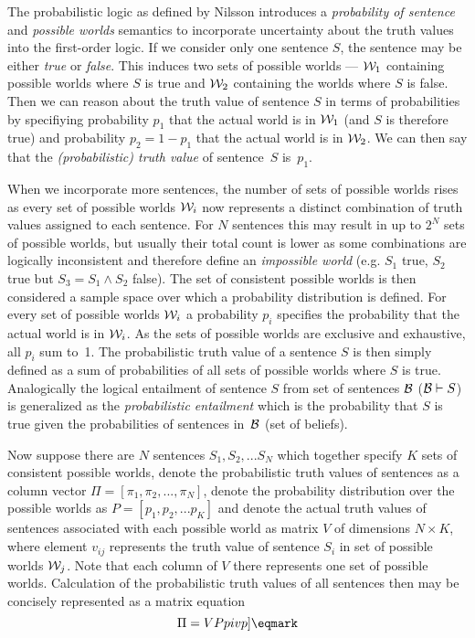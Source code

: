 \par 
The probabilistic logic as defined by Nilsson introduces a {\it probability of sentence} and {\it possible worlds} semantics to incorporate uncertainty about the truth values into the first-order logic. If we consider only one sentence $S$, the sentence may be either {\it true} or {\it false}. This induces two sets of possible worlds --- ${\cal W}_1$ containing possible worlds where $S$ is true and ${\cal W}_2$ containing the worlds where $S$ is false. Then we can reason about the truth value of sentence $S$ in terms of probabilities by specifiying probability $p_1$ that the actual world is in ${\cal W}_1$ (and $S$ is therefore true) and probability $p_2 = 1 - p_1$ that the actual world is in ${\cal W}_2$. We can then say that the {\it (probabilistic) truth value} of sentence~$S$ is~$p_1$.
\par 
When we incorporate more sentences, the number of sets of possible worlds rises as every set of possible worlds ${\cal W}_i$ now represents a distinct combination of truth values assigned to each sentence. For $N$ sentences this may result in up to $2^N$ sets of possible worlds, but usually their total count is lower as some combinations are logically inconsistent and therefore define an {\it impossible world} (e.g. $S_1$ true, $S_2$ true but $S_3 = S_1 \land S_2$ false). The set of consistent possible worlds is then considered a sample space over which a probability distribution is defined. For every set of possible worlds ${\cal W}_i$ a probability $p_i$ specifies the probability that the actual world is in ${\cal W}_i$. As the sets of possible worlds are exclusive and exhaustive, all $p_i$ sum to~1. The probabilistic truth value of a sentence $S$ is then simply defined as a sum of probabilities of all sets of possible worlds where $S$ is true. Analogically the logical entailment of sentence $S$ from set of sentences ${\cal B}$ (${\cal B} \vdash S$) is generalized as the {\it probabilistic entailment} which is the probability that $S$ is true given the probabilities of sentences in~${\cal B}$ (set of beliefs).
\par
Now suppose there are $N$ sentences $S_1, S_2, ... S_N$ which together specify $K$ sets of consistent possible worlds, denote the probabilistic truth values of sentences as a column vector $\Pi=[\pi_1,\pi_2,...,\pi_N]$, denote the probability distribution over the possible worlds as $P=[p_1,p_2,...p_K]$ and denote the actual truth values of sentences associated with each possible world as matrix $V$ of dimensions $N \times K$, where element $v_{ij}$ represents the truth value of sentence $S_i$ in set of possible worlds ${\cal W}_j$. Note that each column of $V$ there represents one set of possible worlds. Calculation of the probabilistic truth values of all sentences then may be concisely represented as a matrix equation
$$ \Pi = VP \label[pivp] \eqmark$$ 

